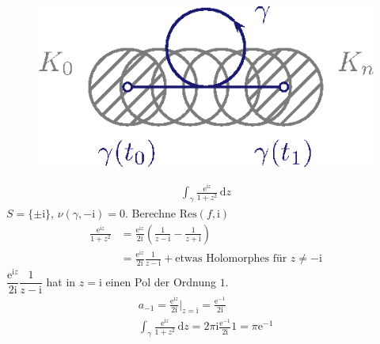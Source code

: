 \documentclass[a4paper,10pt]{scrbook}
\begin{document}
\begin{example} ~
  \begin{figure}[H]
    \centering
    \includegraphics[scale=0.2]{images/ana3-tmp-36}
    \vspace*{-4em}
  \end{figure}
  \begin{align*}
    \int_\gamma \frac{\mathrm{e}^{\mathrm{i} z}}{1 + z^2} \, \mathrm{d}z
  \end{align*}
  $S = \{\pm \mathrm{i}\}$, $\nu(\gamma,-\mathrm{i}) = 0$. Berechne $\mathrm{Res}(f,\mathrm{i})$
  \begin{align*}
    \frac{\mathrm{e}^{\mathrm{i} z}}{1 + z^2}
    &= \frac{\mathrm{e}^{\mathrm{i} z}}{2 \mathrm{i}} \left( \frac{1}{z - \mathrm{i}} - \frac{1}{z + \mathrm{i}} \right) \\
    &= \frac{\mathrm{e}^{\mathrm{i} z}}{2 \mathrm{i}} \frac{1}{z - \mathrm{i}} + \text{etwas Holomorphes für } z \neq -\mathrm{i}
  \end{align*}
  $\dfrac{\mathrm{e}^{\mathrm{i} z}}{2 \mathrm{i}} \dfrac{1}{z - \mathrm{i}}$ hat in $z = \mathrm{i}$ einen Pol der Ordnung $1$.
  \begin{gather*}
    a_{-1} = \frac{\mathrm{e}^{\mathrm{i} z}}{2 \mathrm{i}} \Big|_{z=\mathrm{i}} = \frac{\mathrm{e}^{-1}}{2 \mathrm{i}} \\
    \int_\gamma \frac{\mathrm{e}^{\mathrm{i} z}}{1 + z^2} \, \mathrm{d}z = 2 \pi \mathrm{i} \frac{\mathrm{e}^{-1}}{2 \mathrm{i}} 1 = \pi \mathrm{e}^{-1}
  \end{gather*}
\end{example}

\end{document}
